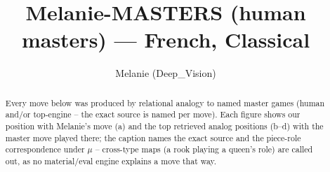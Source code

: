 \documentclass[11pt]{article}
\title{Melanie-MASTERS (human masters) — French, Classical}
\author{Melanie (Deep\_Vision)}
\date{}
\begin{document}
\maketitle

\begin{abstract}Every move below was produced by relational analogy to named master games (human and/or top-engine -- the exact source is named per move). Each figure shows our position with Melanie's move (a) and the top retrieved analog positions (b--d) with the master move played there; the caption names the exact source and the piece-role correspondence under $\mu$ -- cross-type maps (a rook playing a queen's role) are called out, as no material/eval engine explains a move that way.\end{abstract}

\begin{figure}[p]\centering
\begin{subfigure}{0.46\textwidth}\centering
\resizebox{\linewidth}{!}{%
\newchessgame
\chessboard[
  setfen={rnb1k2r/pppnqppp/4p3/3pP3/3P1P2/2N5/PPP3PP/R2QKBNR b KQkq - 0 7},
  showmover=false,
  pgfstyle=straightmove, color=movearrow, markmove={e8-g8}
]}
\caption{}
\end{subfigure}\hfill
\begin{subfigure}{0.46\textwidth}\centering
\resizebox{\linewidth}{!}{%
\newchessgame
\chessboard[
  setfen={rn2k2r/1p1nqppp/p1p1p3/3pP3/3P4/5B1P/PPP2PP1/RN1Q1RK1 b kq - 0 12},
  showmover=false,
  pgfstyle=straightmove, color=movearrow, markmove={e8-g8}
]}
\caption{}
\end{subfigure}
\\[4pt]
\begin{subfigure}{0.46\textwidth}\centering
\resizebox{\linewidth}{!}{%
\newchessgame
\chessboard[
  setfen={r2qk2r/pp3pb1/2p1nnpp/3p4/3P4/2NQPP2/PP2NBPP/R3K2R w KQkq - 5 14},
  showmover=false,
  pgfstyle=straightmove, color=movearrow, markmove={e1-g1}
]}
\caption{}
\end{subfigure}\hfill
\begin{subfigure}{0.46\textwidth}\centering
\resizebox{\linewidth}{!}{%
\newchessgame
\chessboard[
  setfen={r2qk2r/pppn1pbp/3p1np1/8/3PP3/2P4P/PP1NP1PB/R2QKB1R b KQkq - 0 11},
  showmover=false,
  pgfstyle=straightmove, color=movearrow, markmove={e8-g8}
]}
\caption{}
\end{subfigure}

\end{figure}
\end{document}
